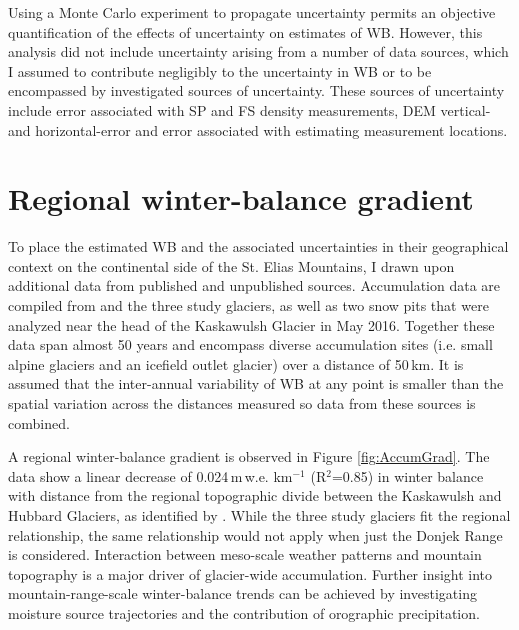 \documentclass{sfuthesis}
\begin{document}
Using a Monte Carlo experiment to propagate uncertainty permits an objective quantification of the effects of uncertainty on estimates of WB. However, this analysis did not include uncertainty arising from a number of data sources, which I assumed to contribute negligibly to the uncertainty in WB or to be encompassed by investigated sources of uncertainty. These sources of uncertainty include error associated with SP and FS density measurements, DEM vertical- and horizontal-error and error associated with estimating measurement locations.



 \section{Regional winter-balance gradient}
 \label{sec:DonjekAccumGrad}

To place the estimated WB and the associated uncertainties in their geographical context on the continental side of the St. Elias Mountains, I drawn upon additional data from published and unpublished sources. Accumulation data are compiled from \cite{Taylor1969} and the three study glaciers, as well as two snow pits that were analyzed near the head of the Kaskawulsh Glacier in May 2016. Together these data span almost 50 years and encompass diverse accumulation sites (i.e. small alpine glaciers and an icefield outlet glacier) over a distance of 50\,km. It is assumed that the inter-annual variability of WB at any point is smaller than the spatial variation across the distances measured so data from these sources is combined.

A regional winter-balance gradient is observed in Figure \ref{fig:AccumGrad}. The data show a linear decrease of 0.024\,m\,w.e. km$^{-1}$ (R$^2$=0.85) in winter balance with distance from the regional topographic divide between the Kaskawulsh and Hubbard Glaciers, as identified by \cite{Taylor1969}. While the three study glaciers fit the regional relationship, the same relationship would not apply when just the Donjek Range is considered. Interaction between meso-scale weather patterns and mountain topography is a major driver of glacier-wide accumulation. Further insight into mountain-range-scale winter-balance trends can be achieved by investigating moisture source trajectories and  the contribution of orographic precipitation. 
\end{document}
